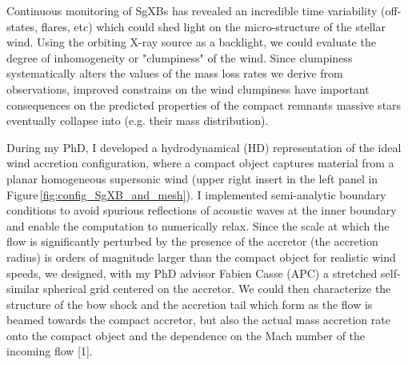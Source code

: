 \documentclass[letterpaper,12pt,onecolumn]{article}
\makeatletter
\newcommand{\sgx}{SgXB\xspace}
\newcommand{\sgxs}{SgXBs\xspace}
\newcommand*{\hmxb}{HMXB\@\xspace}
\newcommand*{\eg}{e.g.\@\xspace}
\makeatother
\begin{document}
\normalsize


Continuous monitoring of \sgxs has revealed an incredible time variability (off-states, flares, etc) which could shed light on the micro-structure of the stellar wind. Using the orbiting X-ray source as a backlight, we could evaluate the degree of inhomogeneity or "clumpiness" of the wind. Since clumpiness systematically alters the values of the mass loss rates we derive from observations, improved constrains on the wind clumpiness have important consequences on the predicted properties of the compact remnants massive stars eventually collapse into (\eg their mass distribution).

During my PhD, I developed a hydrodynamical (HD) representation of the ideal wind accretion configuration, where a compact object captures material from a planar homogeneous supersonic wind (upper right insert in the left panel in Figure\,\ref{fig:config_SgXB_and_mesh}). I implemented semi-analytic boundary conditions to avoid spurious reflections of acoustic waves at the inner boundary and enable the computation to numerically relax. Since the scale at which the flow is significantly perturbed by the presence of the accretor (the accretion radius) is orders of magnitude larger than the compact object for realistic wind speeds, we designed, with my PhD advisor Fabien Casse (APC) a stretched self-similar spherical grid centered on the accretor. We could then characterize the structure of the bow shock and the accretion tail which form as the flow is beamed towards the compact accretor, but also the actual mass accretion rate onto the compact object and the dependence on the Mach number of the incoming flow [1]. 
\end{document}
